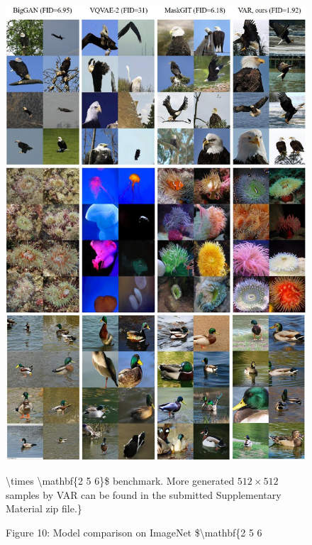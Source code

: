 \documentclass{article}
\begin{document}
\begin{figure}[h]
\begin{center}
  \includegraphics[width=\textwidth]{2025_10_26_62f95e615e8879e267a8g-14}
\captionsetup{labelformat=empty}
\caption{Figure 10: Model comparison on ImageNet \$\textbackslash mathbf\{2 5 6} \textbackslash times \textbackslash mathbf\{2 5 6\}\$ benchmark. More generated $512 \times 512$ samples by VAR can be found in the submitted Supplementary Material zip file.\}\end{center}
\end{figure}
\end{document}
